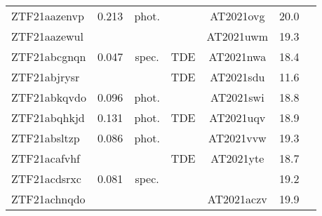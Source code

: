 \begin{table*}
\begin{tabular}{l  c  c  c   c  c  c}
    ZTF21aazenvp       & 0.213      & phot.         & ~                       & AT2021ovg         & 20.0                       &                \\
    ZTF21aazewul       & ~          & ~             & ~                       & AT2021uwm         & 19.3                       &                \\
    ZTF21abcgnqn       & 0.047      & spec.         & TDE                     & AT2021nwa         & 18.4                       &                \\
    ZTF21abjrysr       & ~          & ~             & TDE                     & AT2021sdu         & 11.6                       &                \\
    ZTF21abkqvdo       & 0.096      & phot.         & ~                       & AT2021swi         & 18.8                       &                \\
    ZTF21abqhkjd       & 0.131      & phot.         & TDE                     & AT2021uqv         & 18.9                       &                \\
    ZTF21absltzp       & 0.086      & phot.         & ~                       & AT2021vvw         & 19.3                       &                \\
    ZTF21acafvhf       & ~          & ~             & TDE                     & AT2021yte         & 18.7                       &                \\
    ZTF21acdsrxc       & 0.081      & spec.         & ~                       & ~                 & 19.2                       &                \\
    ZTF21achnqdo       & ~          & ~             & ~                       & AT2021aczv        & 19.9                       &                \\
  \end{tabular}
\end{table*}

